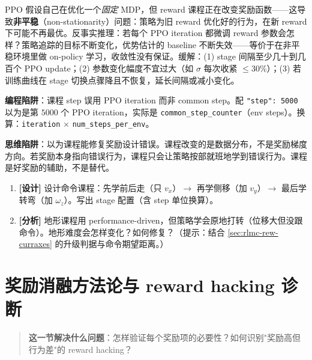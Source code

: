 \begin{insight}\label{ins:rlmc-rew-nonstationary}
PPO 假设自己在优化一个\emph{固定} MDP，但 reward 课程正在改变奖励函数——这导致\textbf{非平稳}（non-stationarity）问题：策略为旧 reward 优化好的行为，在新 reward 下可能不再最优。反事实推理：若每个 PPO iteration 都微调 reward 参数会怎样？策略追踪的目标不断变化，优势估计的 baseline 不断失效——等价于在非平稳环境里做 on-policy 学习，收敛性没有保证。缓解：(1) stage 间隔至少几十到几百个 PPO update；(2) 参数变化幅度不宜过大（如 $\sigma$ 每次收紧 $\le30\%$）；(3) 若训练曲线在 stage 切换点骤降且不恢复，延长间隔或减小变化。
\end{insight}

\begin{pitfall}[两个课程高频错误]
\textbf{编程陷阱}：课程 step 误用 PPO iteration 而非 common step。配 \verb|"step": 5000| 以为是第 $5000$ 个 PPO iteration，实际是 \verb|common_step_counter|（env steps）。换算：\verb|iteration| $\times$ \verb|num_steps_per_env|。

\textbf{思维陷阱}：以为课程能修复奖励设计错误。课程改变的是数据分布，不是奖励梯度方向。若奖励本身指向错误行为，课程只会让策略按部就班地学到错误行为。课程是好奖励的辅助，不是替代。
\end{pitfall}

\begin{practice}[练习·课程]
\begin{enumerate}
  \item \textbf{[设计]} 设计命令课程：先学前后走（只 $v_x$）$\to$ 再学侧移（加 $v_y$）$\to$ 最后学转弯（加 $\omega_z$）。写出 stage 配置（含 step 单位换算）。
  \item \textbf{[分析]} 地形课程用 performance-driven，但策略学会原地打转（位移大但没跟命令）。地形难度会怎样变化？如何修复？（提示：结合 \cref{sec:rlmc-rew-curraxes} 的升级判据与命令期望距离。）
\end{enumerate}
\end{practice}

\section{奖励消融方法论与 reward hacking 诊断}
\label{sec:rlmc-rew-ablation}

\begin{quote}\small
\textbf{这一节解决什么问题}：怎样验证每个奖励项的必要性？如何识别"奖励高但行为差"的 reward hacking？
\end{quote}

